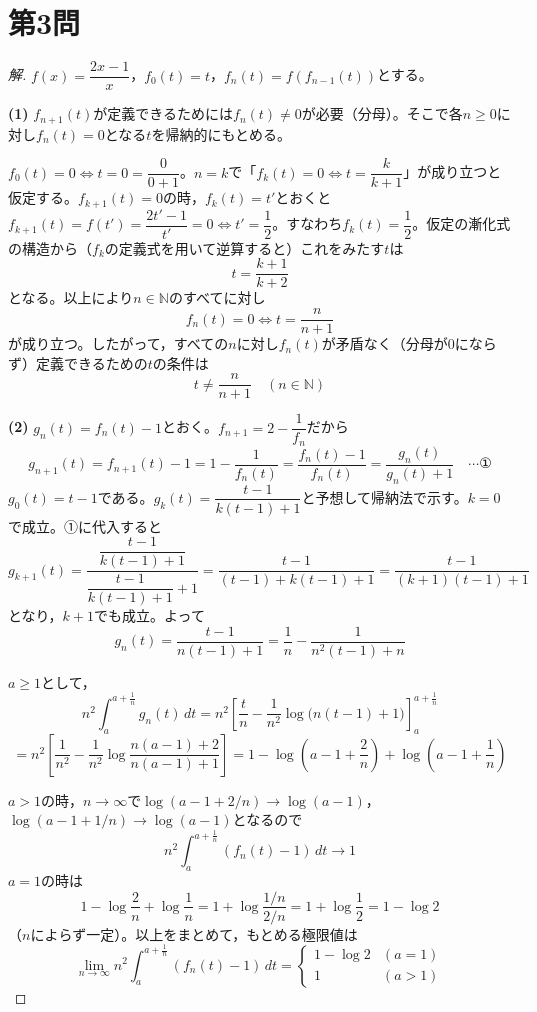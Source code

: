 \documentclass[../main.tex]{subfiles}
\begin{document}
\newpage

\section*{第3問}

\begin{proof}[解]
  $f(x)=\dfrac{2x-1}x$，$f_0(t)=t$，$f_n(t)=f(f_{n-1}(t))$とする。

  \textbf{(1)} $f_{n+1}(t)$が定義できるためには$f_n(t)\ne0$が必要（分母）。そこで各$n\ge0$に対し$f_n(t)=0$となる$t$を帰納的にもとめる。

  $f_0(t)=0\iff t=0=\dfrac0{0+1}$。$n=k$で「$f_k(t)=0\iff t=\dfrac k{k+1}$」が成り立つと仮定する。$f_{k+1}(t)=0$の時，$f_k(t)=t'$とおくと$f_{k+1}(t)=f(t')=\dfrac{2t'-1}{t'}=0\iff t'=\dfrac12$。すなわち$f_k(t)=\dfrac12$。仮定の漸化式の構造から（$f_k$の定義式を用いて逆算すると）これをみたす$t$は
  \[
    t=\frac{k+1}{k+2}
  \]
  となる。以上により$n\in\mathbb N$のすべてに対し
  \[
    f_n(t)=0\iff t=\frac n{n+1}
  \]
  が成り立つ。したがって，すべての$n$に対し$f_n(t)$が矛盾なく（分母が$0$にならず）定義できるための$t$の条件は
  \[
    t\ne\frac n{n+1}\quad(n\in\mathbb N)
  \]

  \textbf{(2)} $g_n(t)=f_n(t)-1$とおく。$f_{n+1}=2-\dfrac1{f_n}$だから
  \[
    g_{n+1}(t)=f_{n+1}(t)-1=1-\frac1{f_n(t)}=\frac{f_n(t)-1}{f_n(t)}=\frac{g_n(t)}{g_n(t)+1}\quad\cdots\text{①}
  \]
  $g_0(t)=t-1$である。$g_k(t)=\dfrac{t-1}{k(t-1)+1}$と予想して帰納法で示す。$k=0$で成立。①に代入すると
  \[
    g_{k+1}(t)=\frac{\dfrac{t-1}{k(t-1)+1}}{\dfrac{t-1}{k(t-1)+1}+1}=\frac{t-1}{(t-1)+k(t-1)+1}=\frac{t-1}{(k+1)(t-1)+1}
  \]
  となり，$k+1$でも成立。よって
  \[
    g_n(t)=\frac{t-1}{n(t-1)+1}=\frac1n-\frac1{n^2(t-1)+n}
  \]

  $a\ge1$として，
  \[
    n^2\int_a^{a+\frac1n}g_n(t)\,dt=n^2\left[\frac tn-\frac1{n^2}\log\bigl(n(t-1)+1\bigr)\right]_a^{a+\frac1n}
  \]
  \[
    =n^2\left[\frac1{n^2}-\frac1{n^2}\log\frac{n(a-1)+2}{n(a-1)+1}\right]=1-\log\left(a-1+\frac2n\right)+\log\left(a-1+\frac1n\right)
  \]

  $a>1$の時，$n\to\infty$で$\log(a-1+2/n)\to\log(a-1)$，$\log(a-1+1/n)\to\log(a-1)$となるので
  \[
    n^2\int_a^{a+\frac1n}(f_n(t)-1)\,dt\longrightarrow1
  \]
  $a=1$の時は
  \[
    1-\log\frac2n+\log\frac1n=1+\log\frac{1/n}{2/n}=1+\log\frac12=1-\log2
  \]
  （$n$によらず一定）。以上をまとめて，もとめる極限値は
  \[
    \lim_{n\to\infty}n^2\int_a^{a+\frac1n}(f_n(t)-1)\,dt=
    \begin{cases}
      1-\log2 & (a=1)\\
      1 & (a>1)
    \end{cases}
  \]
\end{proof}
\end{document}
